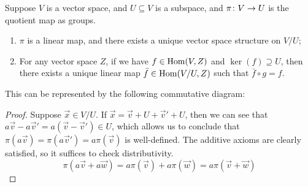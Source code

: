 \begin{proposition}
    Suppose \(V\) is a vector space, and \(U \subseteq V\) is a subspace,
    and \(\pi\colon V\to U\) is the quotient map as groups.
    \begin{enumerate}[label={(\alph*)}, itemsep=0mm]
        \item \(\pi\) is a linear map, and there exists a unique vector space structure on \(V/U\);
        \item For any vector space \(Z\), if we have \(f \in \operatorname{Hom}(V,Z)\) and \(\ker(f) \supseteq U\),
            then there exists a unique linear map \(\bar{f} \in \operatorname{Hom}(V/U,Z)\)
            such that \(\bar{f} \circ g = f\).
    \end{enumerate}

    This can be represented by the following commutative diagram:
    \begin{center}
    \end{center}
\end{proposition}
\begin{proof}
    Suppose \(\vec{x} \in V/U\).
    If \(\vec{x} = \vec{v} + U + \vec{v}' + U\),
    then we can see that \(a\vec{v}-a\vec{v}' = a(\vec{v}-\vec{v}') \in U\),
    which allows us to conclude that \(\pi(a\vec{v}) = \pi(a\vec{v}') = a\pi(\vec{v})\)
    is well-defined.
    The additive axioms are clearly satisfied,
    so it suffices to check distributivity.
    \begin{equation*}
        \pi(a\vec{v}+a\vec{w}) = a\pi(\vec{v}) + a\pi(\vec{w})
        = a\pi(\vec{v} +\vec{w})
    \end{equation*}
\end{proof}

